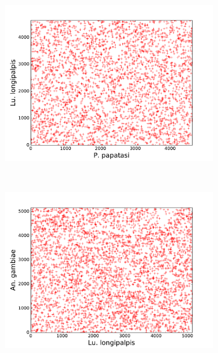 \begin{figure}[H]
  \centering
  \caption{Qualitative Analysis of Macrosynteny}
  \begin{subfigure}[b]{0.4\textwidth}
    \includegraphics[width=\textwidth]{figures/synteny/papatasi_longipalpis_plot}
    \caption{\label{fig:synteny-dotplots-sandflies}}
  \end{subfigure}
  \\
  \begin{subfigure}[b]{0.4\textwidth}
    \includegraphics[width=\textwidth]{figures/synteny/longipalpis_anopheles_plot}
    \caption{\label{fig:synteny-dotplots-longipalpis-anopheles}}
  \end{subfigure}
  ~
  \begin{subfigure}[b]{0.4\textwidth}

\end{subfigure}
\end{figure}
